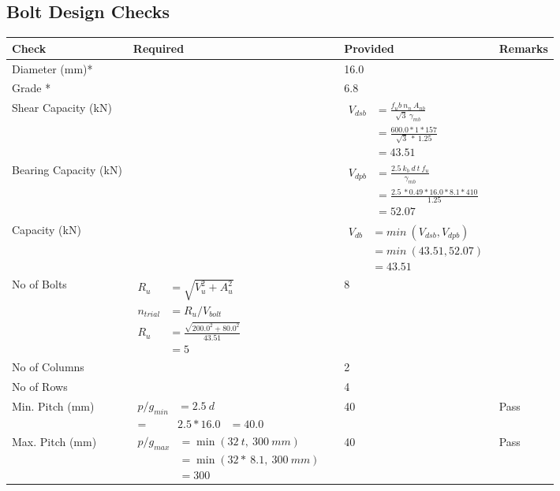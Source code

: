 \documentclass{article}%
\begin{document}
\subsection{Bolt Design Checks}%
\label{subsec:BoltDesignChecks}%
\renewcommand{\arraystretch}{1.2}%
\begin{longtable}{|p{4cm}|p{5cm}|p{5.5cm}|p{1.5cm}|}%
\hline%
\rowcolor{OsdagGreen}%
Check&Required&Provided&Remarks\\%
\hline%
\endhead%
\hline%
Diameter (mm)*&&16.0&\\%
\hline%
Grade *&&6.8&\\%
\hline%
Shear Capacity (kN)&&$\begin{aligned}V_{dsb} &= \frac{f_ub ~n_n~ A_{nb}}{\sqrt{3} ~\gamma_{mb}}\\ &= \frac{600.0*1*157}{\sqrt{3}~*~1.25}\\ &= 43.51\end{aligned}$&\\%
\hline%
Bearing Capacity (kN)&&$\begin{aligned}V_{dpb} &= \frac{2.5~ k_b~ d~ t~ f_u}{\gamma_{mb}}\\ &= \frac{2.5~*0.49*16.0*8.1*410}{1.25}\\ &=52.07\end{aligned}$&\\%
\hline%
Capacity (kN)&&$\begin{aligned}V_{db} &= min~ (V_{dsb}, V_{dpb})\\ &= min~ (43.51,52.07)\\ &=43.51\end{aligned}$&\\%
\hline%
No of Bolts&$\begin{aligned}R_{u} &= \sqrt{V_u^2+A_u^2}\\ n_{trial} &= R_u/ V_{bolt}\\ R_{u} &= \frac{\sqrt{200.0^2+80.0^2}}{43.51}\\ &=5\end{aligned}$&8&\\%
\hline%
No of Columns&&2&\\%
\hline%
No of Rows&&4&\\%
\hline%
Min. Pitch (mm)&$\begin{aligned}p/g_{min}&= 2.5 ~ d&\\ =&2.5*16.0&=40.0\end{aligned}$&40&Pass\\%
\hline%
Max. Pitch (mm)&$\begin{aligned}p/g_{max} &=\min(32~t,~300~mm)&\\ &=\min(32 *~8.1,~ 300 ~mm)\\&=300\end{aligned}$&40&Pass\\%

\end{longtable}
\end{document}

